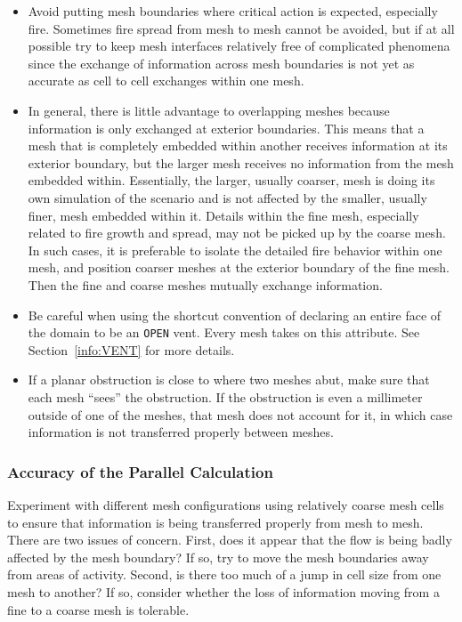 \documentclass[11pt]{book}
\newcommand{\ct}{\tt\small}
\begin{document}
\begin{itemize}
\item Avoid putting mesh boundaries where critical action is expected,
especially fire. Sometimes fire spread from mesh to mesh cannot be
avoided, but if at all possible try to keep mesh interfaces relatively
free of complicated phenomena since the exchange of information across
mesh boundaries is not yet as accurate as cell to cell exchanges within one
mesh.

\item In general, there is little advantage to overlapping meshes because
information is only exchanged at exterior boundaries. This means that a mesh that is completely embedded within
another receives information at its exterior boundary, but the larger
mesh receives no information from the mesh embedded within. Essentially,
the larger, usually coarser, mesh is doing its own simulation of the scenario
and is not affected by the smaller, usually finer, mesh embedded within it.
Details within the fine mesh, especially related to fire growth and spread,
may not be picked up by the coarse mesh. In such cases, it is preferable to
isolate the detailed fire behavior within one mesh, and position coarser
meshes at the exterior boundary of the fine mesh. Then the fine and coarse
meshes mutually exchange information.

\item Be careful when using the shortcut convention of declaring an
entire face of the domain to be an {\ct OPEN} vent. Every mesh
takes on this attribute. See Section~\ref{info:VENT} for more details.

\item If a planar obstruction is close to where two meshes abut, make sure that each
mesh ``sees'' the obstruction. If the obstruction is even a millimeter outside of one
of the meshes, that mesh does not account for it, in which case information is not
transferred properly between meshes.
\end{itemize}


\subsubsection{Accuracy of the Parallel Calculation}

Experiment with different mesh configurations using relatively
coarse mesh cells to ensure that information is being transferred
properly from mesh to mesh. There are two issues of concern. First,
does it appear that the flow is being badly affected by the mesh boundary? If so,
try to move the mesh boundaries away from areas of activity. Second,
is there too much of a jump in cell size from one mesh to another? If so, consider
whether the loss of information moving from a fine to a coarse mesh is tolerable.
\end{document}
